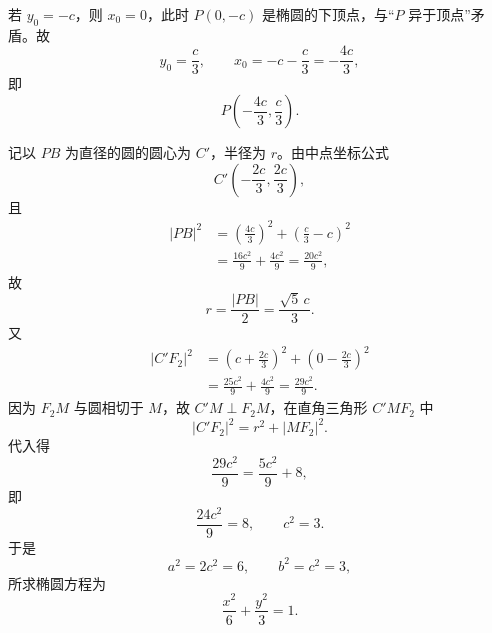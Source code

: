\begin{answer}
若 $y_0=-c$，则 $x_0=0$，此时 $P(0,-c)$ 是椭圆的下顶点，与“$P$ 异于顶点”矛盾。故
\nopagebreak[4]
\[y_0=\frac c3,\qquad x_0=-c-\frac c3=-\frac{4c}{3},\]
即
\nopagebreak[4]
\[P\left(-\frac{4c}{3},\frac c3\right).\]

记以 $PB$ 为直径的圆的圆心为 $C'$，半径为 $r$。由中点坐标公式
\nopagebreak[4]
\[C'\left(-\frac{2c}{3},\frac{2c}{3}\right),\]
且
\nopagebreak[4]
\[\begin{aligned}
|PB|^2&=\left(\frac{4c}{3}\right)^2+\left(\frac c3-c\right)^2\\
&=\frac{16c^2}{9}+\frac{4c^2}{9}=\frac{20c^2}{9},
\end{aligned}\]
故
\nopagebreak[4]
\[r=\frac{|PB|}{2}=\frac{\sqrt5\,c}{3}.\]
又
\nopagebreak[4]
\[\begin{aligned}
|C'F_2|^2&=\left(c+\frac{2c}{3}\right)^2+\left(0-\frac{2c}{3}\right)^2\\
&=\frac{25c^2}{9}+\frac{4c^2}{9}=\frac{29c^2}{9}.
\end{aligned}\]
因为 $F_2M$ 与圆相切于 $M$，故 $C'M\perp F_2M$，在直角三角形 $C'MF_2$ 中
\nopagebreak[4]
\[|C'F_2|^2=r^2+|MF_2|^2.\]
代入得
\nopagebreak[4]
\[\frac{29c^2}{9}=\frac{5c^2}{9}+8,\]
即
\nopagebreak[4]
\[\frac{24c^2}{9}=8,\qquad c^2=3.\]
于是
\nopagebreak[4]
\[a^2=2c^2=6,\qquad b^2=c^2=3,\]
所求椭圆方程为
\nopagebreak[4]
\[\frac{x^2}{6}+\frac{y^2}{3}=1.\]



\end{answer}
